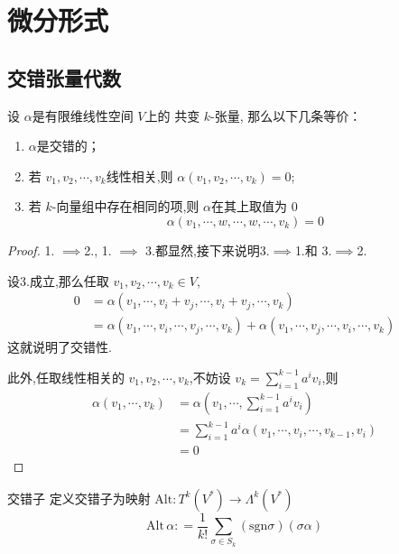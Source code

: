 \documentclass[../../几何与拓扑.tex]{subfiles}
\begin{document}
    
\chapter{微分形式}
\section{交错张量代数}

\begin{lemma}\label{alt-tensor-lemma}
    设 $ \alpha $是有限维线性空间 $ V $上的 共变 $ k $-张量, 那么以下几条等价：
    \begin{enumerate}
        \item $ \alpha $是交错的；
        \item 若 $ v_1,v_2,\cdots,v_k $线性相关,则 $ \alpha\left( v_1,v_2,\cdots,v_k \right)=0  $;
        \item 若 $ k $-向量组中存在相同的项,则 $ \alpha $在其上取值为 $ 0 $       $$
        \alpha\left( v_1,\cdots ,w,\cdots ,w,\cdots ,v_{k} \right)=0 
        $$
    \end{enumerate}
    
\end{lemma}
\begin{proof}
    1. $ \implies $2., 1. $ \implies $ 3.都显然,接下来说明3.$ \implies $1.和 3.$ \implies $2.    

    设3.成立,那么任取 $ v_1,v_2,\cdots,v_k\in V $, $$
    \begin{aligned}
    0 & = \alpha\left( v_1,\cdots ,v_{i}+ v_{j},\cdots ,v_{i}+ v_{j},\cdots ,v_{k} \right)\\ 
     & = \alpha\left( v_1,\cdots ,v_{i},\cdots ,v_{j},\cdots ,v_{k} \right)   + \alpha\left( v_1,\cdots ,v_{j},\cdots ,v_{i},\cdots ,v_{k} \right) 
    \end{aligned}
    $$这就说明了交错性. 

    此外,任取线性相关的 $ v_1,v_2,\cdots,v_k $,不妨设 $ v_{k} = \sum_{i=1  }^{k-1} a^{i}v_{i} $,则 $$
    \begin{aligned}
    \alpha\left( v_1,\cdots ,v_{k} \right)& = \alpha\left( v_1,\cdots , \sum_{i=1}^{k-1}a^{i}v_{i} \right)   \\ 
     & = \sum_{i=1}^{k-1} a^{i} \alpha\left( v_1,\cdots ,v_{i},\cdots ,v_{k-1},v_{i} \right)\\ 
      & = 0 
    \end{aligned}
    $$  
\end{proof}

\begin{definition}{交错子}
    定义交错子为映射 $ \mathrm{Alt}:T^{k}\left( V^{*} \right)\to  \Lambda ^{k}\left( V^{*} \right)   $ $$
    \mathrm{Alt}\,\alpha: =  \frac{1}{k!} \sum_{\sigma \in S_{k}} \left( \mathrm{sgn}\sigma \right) \left( \sigma \alpha \right)  
    $$ 
\end{definition}
\end{document}
